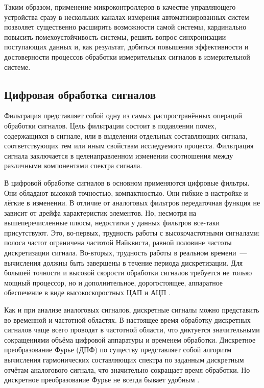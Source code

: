 \documentclass[a4paper, 14pt, titlepage]{extarticle}
\begin{document}
  Таким образом, применение микроконтроллеров в качестве управляющего устройства сразу в нескольких
  каналах измерения автоматизированных систем позволяет существенно расширить возможности самой
  системы, кардинально повысить помехоустойчивость системы, решить вопрос синхронизации поступающих
  данных и, как результат, добиться повышения эффективности и достоверности процессов обработки
  измерительных сигналов в измерительной системе.

  \subsection{Цифровая обработка сигналов}\label{ssec:signal-processing}


  Фильтрация представляет собой одну из самых распространённых операций обработки сигналов. Цель
  фильтрации состоит в подавлении помех, содержащихся в сигнале, или в выделении отдельных
  составляющих сигнала, соответствующих тем или иным свойствам исследуемого процесса. Фильтрация
  сигнала заключается в целенаправленном изменении соотношения между различными компонентами спектра
  сигнала.

  В цифровой обработке сигналов в основном применяются цифровые фильтры. Они обладают высокой
  точностью, компактностью. Они гибкие в настройке и лёгкие в изменении. В отличие от аналоговых
  фильтров передаточная функция не зависит от дрейфа характеристик элементов. Но, несмотря на
  вышеперечисленные плюсы, недостатки у данных фильтров все-таки присутствуют. Это, во-первых, трудность работы с
  высокочастотными сигналами: полоса частот ограничена частотой Найквиста, равной половине частоты
  дискретизации сигнала. Во-вторых, трудность работы в реальном времени~--- вычисления должны быть завершены в
  течение периода дискретизации. Для большей точности и высокой скорости обработки сигналов
  требуется не только мощный процессор, но и дополнительное, дорогостоящее, аппаратное обеспечение в
  виде высокоскоростных ЦАП и АЦП \cite{glinchenko-digital}.

  Как и при анализе аналоговых сигналов, дискретные сигналы можно представить во временной и
  частотной областях. В настоящее время обработку дискретных сигналов чаще всего проводят в
  частотной области, что диктуется значительными сокращениями объёма цифровой аппаратуры и временем
  обработки. Дискретное преобразование Фурье (ДПФ) по существу представляет собой алгоритм вычисления
  гармонических составляющих спектра по заданным дискретным отчётам аналогового сигнала, что
  значительно сокращает время обработки.  Но дискретное преобразование Фурье не всегда бывает
  удобным \cite{solonina-algorithms}.
\end{document}
